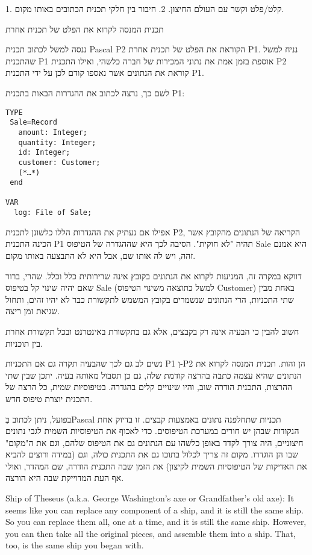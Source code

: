 \begin{טבלא}[!htbp]
      1. קלט/פלט וקשר עם העולם החיצון.
      2. חיבור בין חלקי תכנית הכתובים באותו מקום.

      תכנית המנסה לקרוא את הפלט של תכנית אחרת

      ננסה למשל לכתוב תכנית Pascal P2 הקוראת את הפלט של תכנית אחרת P1. נניח למשל שהתכנית P1 אוספת בזמן אמת את נתוני המכירות של חברה כלשהי, ואילו התכנית P2 קוראת את הנתונים אשר נאספו קודם לכן על ידי התכנית P1.

      לשם כך, נרצה לכתוב את ההגדרות הבאות בתכנית P1:

\begin{verbatim}
TYPE
 Sale=Record
   amount: Integer;
   quantity: Integer;
   id: Integer;
   customer: Customer;
   (*…*)
 end

VAR
  log: File of Sale;
\end{verbatim}

      אפילו אם נעתיק את ההגדרות הללו כלשונן לתכנית P2, הקריאה של הנתונים מהקובץ אשר
      הכינה התכנית P1 תהיה "לא חוקית". הסיבה לכך היא שההגדרה של הטיפוס Sale היא אמנם
      זהה, ויש לה אותו שם, אבל היא לא התבצעה באותו מקום.

      דווקא במקרה זה, המניעות לקרוא את הנתונים בקובץ אינה שרירותית כלל וכלל. שהרי,
      ברור שאם יהיה שינוי קל בטיפוס Sale (למשל כתוצאה משינוי הטיפוס Customer) באחת
      מבין שתי התכניות, הרי הנתונים שנשמרים בקובץ המשמש לתקשורת כבר לא יהיו זהים,
      ותחול שגיאת זמן ריצה.

      חשוב להבין כי הבעיה אינה רק בקבצים, אלא גם בתקשורת באינטרנט ובכל תקשורת אחרת
      בין תוכניות.

      נשים לב גם לכך שהבעיה תקרה גם אם התכניות P1 וְ-P2 הן זהות. תכנית המנסה לקרוא את הנתונים שהיא עצמה כתבה בהרצה קודמת שלה, גם כן תסבול מאותה בעיה. יתכן שבין שתי ההרצות, התכנית הודרה שוב, והיו שינויים קלים בהגדרה. בטיפוסיות שמית, כל הרצה של התכנית יוצרת טיפוס חדש.

      בפועל, ניתן לכתוב בְּPascal תכניות שתחלפנה נתונים באמצעות קבצים. זו בדיוק אחת
      הנקודות שבהן יש חורים במערכת הטיפוסים. כדי לאכוף את הטיפוסיות השמית לגבי נתונים
      חיצוניים, היה צורך לקדד באופן כלשהו עם הנתונים גם את הטיפוס שלהם, וגם את
      ה"מקום" שבו הן הוגדרו. מקום זה צריך לכלול בתוכו גם את התכנית כולה, וגם (במידה
      ורוצים להביא את האדיקות של הטיפוסיות השמית לקיצון) את הזמן שבה התכנית הודרה, שם
      המהדר, ואולי אף העת המדוייקת שבה היא הורצה.

      Ship of Theseus (a.k.a. George Washington's axe or Grandfather's old axe): It
      seems like you can replace any component of a ship, and it is still the same
      ship. So you can replace them all, one at a time, and it is still the same
      ship. However, you can then take all the original pieces, and assemble them
      into a ship. That, too, is the same ship you began with.


\end{טבלא}
